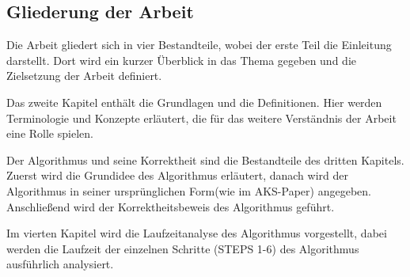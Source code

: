 \documentclass[12pt,oneside]{article}
\theoremstyle{remark}
\theoremstyle{definition}
\begin{document}
\subsection{Gliederung der Arbeit}
Die Arbeit gliedert sich in vier Bestandteile, wobei der
erste Teil die Einleitung darstellt. Dort wird ein kurzer Überblick in das Thema gegeben und die Zielsetzung der Arbeit definiert.

Das zweite Kapitel enthält die Grundlagen und die Definitionen. Hier werden Terminologie und Konzepte erläutert, die für das weitere Verständnis der Arbeit eine Rolle spielen. 

Der Algorithmus und seine Korrektheit sind die Bestandteile des dritten Kapitels. Zuerst wird die Grundidee des Algorithmus erläutert, danach wird der Algorithmus in seiner ursprünglichen Form(wie im AKS-Paper) angegeben. Anschließend wird der Korrektheitsbeweis des Algorithmus geführt.

Im vierten Kapitel wird die Laufzeitanalyse des Algorithmus vorgestellt, dabei werden die Laufzeit der einzelnen Schritte (STEPS 1-6) des Algorithmus ausführlich analysiert.    
\end{document}
